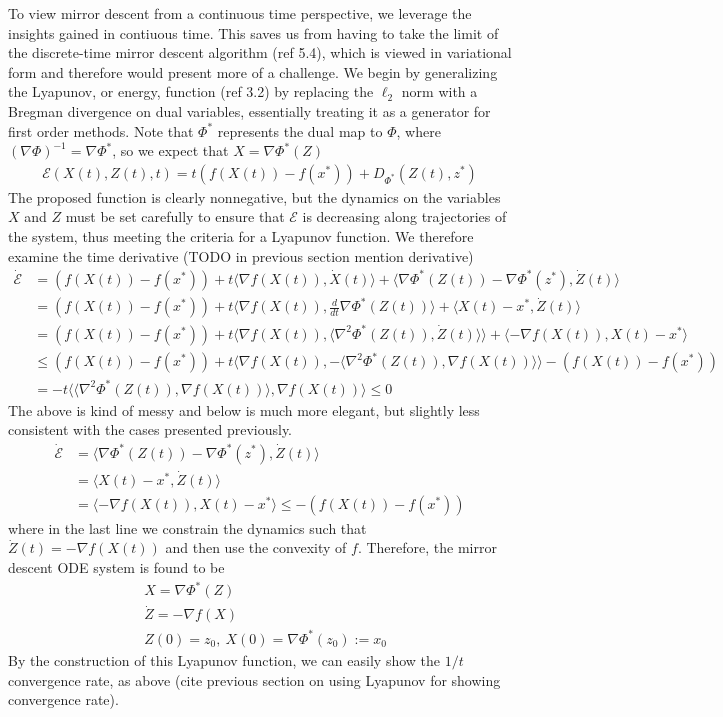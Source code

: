 To view mirror descent from a continuous time perspective, we leverage the insights gained in contiuous time. This saves us from having to take the limit of the discrete-time mirror descent algorithm (ref 5.4), which is viewed in variational form and therefore would present more of a challenge. We begin by generalizing the Lyapunov, or energy, function (ref 3.2) by replacing the $\ell_2$ norm with a Bregman divergence on dual variables, essentially treating it as a generator for first order methods. Note that $\Phi^*$ represents the dual map to $\Phi$, where $(\nabla \Phi)^{-1} = \nabla \Phi^*$, so we expect that $X = \nabla \Phi ^* (Z)$
\begin{align*}
\mathcal{E}(X(t), Z(t), t) = t(f(X(t)) - f(x^*)) + D_{\Phi^*} (Z(t), z^*)
\end{align*}
The proposed function is clearly nonnegative, but the dynamics on the variables $X$ and $Z$ must be set carefully to ensure that $\mathcal{E}$ is decreasing along trajectories of the system, thus meeting the criteria for a Lyapunov function. We therefore examine the time derivative (TODO in previous section mention derivative)
\begin{align*}
\dot {\mathcal{E}} &= (f(X(t)) - f(x^*)) + t\langle \nabla f(X(t)), \dot X(t) \rangle +  \langle \nabla \Phi^* (Z(t)) -  \nabla \Phi^* (z^*), \dot{Z}(t) \rangle\\
&= (f(X(t)) - f(x^*)) + t\langle \nabla f(X(t)), \frac{d}{dt}\nabla\Phi^*(Z(t)) \rangle + \langle X(t) -  x^*, \dot{Z}(t) \rangle\\
&= (f(X(t)) - f(x^*)) + t\langle\nabla f(X(t)), \langle \nabla^2\Phi^*(Z(t)), \dot Z(t) \rangle \rangle + \langle -\nabla f(X(t)), X(t) -  x^* \rangle \\
& \leq (f(X(t)) - f(x^*)) + t\langle\nabla f(X(t)), - \langle \nabla^2\Phi^*(Z(t)), \nabla f(X(t)) \rangle \rangle -(f(X(t)) - f(x^*))\\
& =  -t\langle  \langle \nabla^2\Phi^*(Z(t)), \nabla f(X(t)) \rangle,\nabla f(X(t))  \rangle \leq 0
\end{align*}
The above is kind of messy and below is much more elegant, but slightly less consistent with the cases presented previously. 
\begin{align*}
\dot {\mathcal{E}} &= \langle \nabla \Phi^* (Z(t)) -  \nabla \Phi^* (z^*), \dot{Z}(t) \rangle\\
&=\langle X(t) -  x^*, \dot{Z}(t) \rangle\\
&= \langle -\nabla f(X(t)), X(t) -  x^* \rangle \leq -(f(X(t)) - f(x^*))
\end{align*}
where in the last line we constrain the dynamics such that $\dot Z(t) = -\nabla f(X(t))$ and then use the convexity of $f$. Therefore, the mirror descent ODE system is found to be
\begin{align*}
&X = \nabla \Phi^*(Z)\\
&\dot Z = - \nabla f(X)\\
& Z(0) = z_0,~X(0) = \nabla \Phi^*(z_0) := x_0
\end{align*}
By the construction of this Lyapunov function, we can easily show the $1/t$ convergence rate, as above (cite previous section on using Lyapunov for showing convergence rate).

